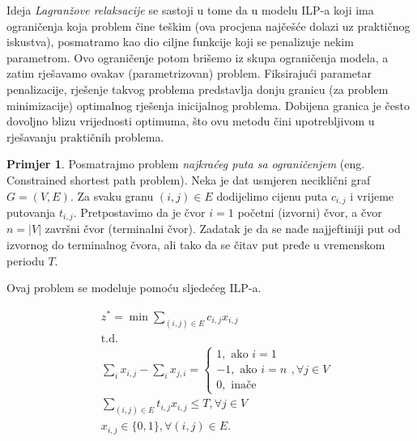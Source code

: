 \documentclass[b5paper, utf8, 11pt, colorlinks]{book}
\theoremstyle{definition}
\newtheorem{primjer}{Primjer}[chapter]
\begin{document}
Ideja \emph{Lagranžove relaksacije} se sastoji u tome da u modelu ILP-a  koji ima  ograničenja koja problem čine teškim (ova procjena najčešće dolazi uz praktičnog iskustva),  posmatramo kao dio ciljne funkcije koji se penalizuje nekim parametrom.  %
Ovo ograničenje potom brišemo iz skupa ograničenja modela, a zatim rješavamo ovakav (parametrizovan) problem. Fiksirajući parametar penalizacije, rješenje takvog problema predstavlja donju granicu (za problem minimizacije)  optimalnog rješenja inicijalnog problema. Dobijena granica je često dovoljno blizu vrijednosti optimuma, što ovu metodu čini upotrebljivom u rješavanju praktičnih problema. 

\begin{primjer} Posmatrajmo problem \emph{najkraćeg puta sa ograničenjem} (eng.  {Constrained shortest path problem}). Neka je dat usmjeren neciklični graf $G=(V,E)$. Za svaku granu $(i,j) \in E$ dodijelimo cijenu puta $c_{i,j}$ i vrijeme putovanja $t_{i,j}$. Pretpostavimo da je čvor $i=1$ početni (izvorni) čvor, a čvor $n = |V|$   završni čvor (terminalni čvor). Zadatak je da se nađe najjeftiniji put  od izvornog do terminalnog čvora, ali tako da se čitav put pređe u vremenskom periodu $T$.

Ovaj problem se modeluje pomoću sljedećeg ILP-a.
\end{primjer}
 \begin{align}
    &z^*=\min\sum_{(i,j) \in E }c_{i,j}x_{i,j} \\
    &\mbox{t.d. }\\
    & \sum_{i} x_{i,j} - \sum_{i} x_{j,i} = \begin{cases}  
                                               1, \mbox{ ako } i=1 \\
                                              -1, \mbox{ ako } i=n \\
                                               0, \mbox{ inače }
                                            \end{cases},  \forall j \in V \\ 
    & \sum_{(i,j) \in E} t_{i,j} x_{i,j} \leq T, \forall j \in V \\
    & x_{i,j} \in \{0, 1 \}, \forall (i,j) \in E.
\end{align} 
\end{document}
